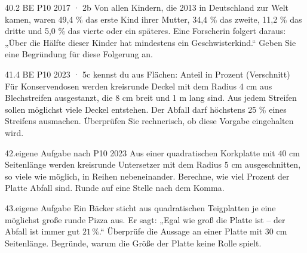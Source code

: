 \documentclass[11pt]{article}
\begin{document}
\begin{pfaufgabe}{40.}{2 BE \textperiodcentered{} P10 2017 · 2b}
Von allen Kindern, die 2013 in Deutschland zur Welt kamen, waren 49,4 \% das erste Kind ihrer Mutter, 34,4 \% das zweite, 11,2 \% das dritte und 5,0 \% das vierte oder ein späteres. Eine Forscherin folgert daraus: „Über die Hälfte dieser Kinder hat mindestens ein Geschwisterkind.“ Geben Sie eine Begründung für diese Folgerung an.
\end{pfaufgabe}
\begin{pfaufgabe}{41.}{4 BE \textperiodcentered{} P10 2023 · 5c \textperiodcentered{} kennst du aus Flächen: Anteil in Prozent (Verschnitt)}
Für Konservendosen werden kreisrunde Deckel mit dem Radius 4 cm aus Blechstreifen ausgestanzt, die 8 cm breit und 1 m lang sind. Aus jedem Streifen sollen möglichst viele Deckel entstehen. Der Abfall darf höchstens 25 \% eines Streifens ausmachen. Überprüfen Sie rechnerisch, ob diese Vorgabe eingehalten wird.
\end{pfaufgabe}
\begin{pfaufgabe}{42.}{eigene Aufgabe nach P10 2023}
Aus einer quadratischen Korkplatte mit $40$ cm Seitenlänge werden kreisrunde Untersetzer mit dem Radius $5$ cm ausgeschnitten, so viele wie möglich, in Reihen nebeneinander. Berechne, wie viel Prozent der Platte Abfall sind. Runde auf eine Stelle nach dem Komma.
\end{pfaufgabe}
\begin{pfaufgabe}{43.}{eigene Aufgabe}
Ein Bäcker sticht aus quadratischen Teigplatten je eine möglichst große runde Pizza aus. Er sagt: „Egal wie groß die Platte ist – der Abfall ist immer gut $21\,\%$.“ Überprüfe die Aussage an einer Platte mit $30$ cm Seitenlänge. Begründe, warum die Größe der Platte keine Rolle spielt.
\end{pfaufgabe}
\end{document}
